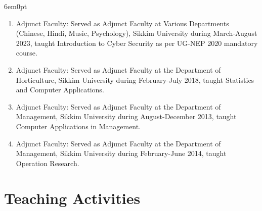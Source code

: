 \documentclass[11pt,a4paper]{moderncv}
\begin{document}
\begin{adjustwidth}{6em}{0pt}
	\begin{enumerate}
		\item Adjunct Faculty: Served as Adjunct Faculty at Various Departments (Chinese, Hindi, Music, Psychology), Sikkim University during March-August 2023, taught Introduction to Cyber Security as per UG-NEP 2020 mandatory course.
		
		\item Adjunct Faculty: Served as Adjunct Faculty at the Department of Horticulture, Sikkim University during February-July 2018, taught Statistics and Computer Applications.
		
		\item Adjunct Faculty: Served as Adjunct Faculty at the Department of Management, Sikkim University during August-December 2013, taught Computer Applications in Management.
		
		\item Adjunct Faculty: Served as Adjunct Faculty at the Department of Management, Sikkim University during February-June 2014, taught Operation Research.
		
	\end{enumerate}
\end{adjustwidth}




\section{\textbf{Teaching Activities}}
\end{document}
